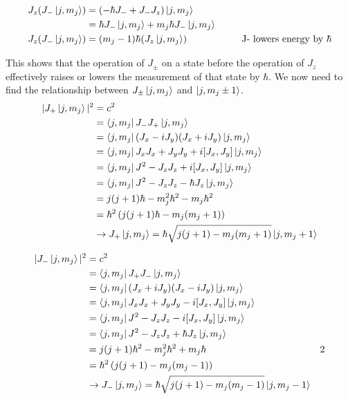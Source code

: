 \documentclass[10pt]{article} %
\begin{document}
\begin{align*}
  J_z(J_-\ket{j,m_j}) &= (-\hbar J_- + J_-J_z)\ket{j,m_j}\\
  &= \hbar J_-\ket{j,m_j} + m_j \hbar J_-\ket{j,m_j}\\
  J_z(J_-\ket{j,m_j}) &= (m_j-1)\hbar(J_z\ket{j,m_j})
  \hspace{2cm}\mbox{J- lowers energy by $\hbar$}\\
\end{align*}

This shows that the operation of $J_\pm$ on a state before the operation of $J_z$ effectively
raises or lowers the measurement of that state by $\hbar$. We now need to find the relationship
between $J_\pm\ket{j,m_j}$ and $\ket{j,m_j\pm1}$.\\

\begin{align*}
  |J_+\ket{j,m_j}|^2 &= c^2\\
  &= \bra{j,m_j}J_-J_+\ket{j,m_j}\\
  &= \bra{j,m_j}(J_x-iJ_y)(J_x+iJ_y)\ket{j,m_j}\\
  &= \bra{j,m_j}J_xJ_x + J_yJ_y + i[J_x,J_y]\ket{j,m_j}\\
  &= \bra{j,m_j}J^2 - J_zJ_z + i[J_x,J_y]\ket{j,m_j}\\
  &= \bra{j,m_j}J^2 - J_zJ_z - \hbar J_z\ket{j,m_j}\\
  &= j(j+1)\hbar - m_j^2\hbar^2 - m_j\hbar^2\\
  &= \hbar^2\left(j(j+1)\hbar - m_j(m_j + 1)\right)\\
  &\rightarrow J_+\ket{j,m_j} = \hbar\sqrt{j(j+1) - m_j(m_j+1)}\ket{j,m_j+1}\\
\end{align*}

\begin{align*}
  |J_-\ket{j,m_j}|^2 &= c^2\\
  &= \bra{j,m_j}J_+J_-\ket{j,m_j}\\
  &= \bra{j,m_j}(J_x+iJ_y)(J_x-iJ_y)\ket{j,m_j}\\
  &= \bra{j,m_j}J_xJ_x + J_yJ_y - i[J_x,J_y]\ket{j,m_j}\\
  &= \bra{j,m_j}J^2 - J_zJ_z - i[J_x,J_y]\ket{j,m_j}\\
  &= \bra{j,m_j}J^2 - J_zJ_z + \hbar J_z\ket{j,m_j}\\
  &= j(j+1)\hbar^2 - m_j^2\hbar^2 + m_j\hbar&2\\
  &= \hbar^2\left(j(j+1) - m_j(m_j-1)\right)\\
  &\rightarrow J_-\ket{j,m_j} = \hbar\sqrt{j(j+1) - m_j(m_j-1)}\ket{j,m_j-1}\\
\end{align*}
\end{document}
